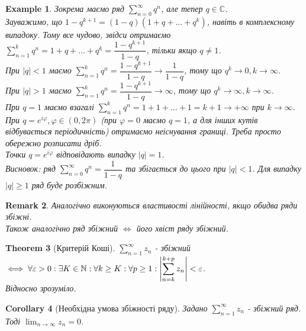 \documentclass[a4paper, 10pt]{article}
\theoremstyle{theoremdd}
\newtheorem{theorem}{Theorem}[subsection]
\theoremstyle{theoremdd}
\theoremstyle{theoremdd}
\theoremstyle{theoremdd}
\newtheorem{example}[theorem]{Example}
\theoremstyle{theoremdd}
\theoremstyle{theoremdd}
\newtheorem{remark}[theorem]{Remark}
\theoremstyle{theoremdd}
\theoremstyle{theoremdd}
\newtheorem{corollary}[theorem]{Corollary}
\begin{document}
\begin{example}
Зокрема маємо ряд $\displaystyle\sum_{n=0}^\infty q^n$, але тепер $q \in \mathbb{C}$.\\
Зауважимо, що $1-q^{k+1} = (1-q)(1+q+\dots+q^k)$, навіть в комплексному випадоку. Тому все чудово, звідси отримаємо\\
$\displaystyle\sum_{n=1}^k q^n = 1 + q + \dots + q^k = \dfrac{1-q^{k+1}}{1-q}$, тільки якщо $q \neq 1$.\\
При $|q| < 1$ маємо $\displaystyle\sum_{n=1}^k q^n = \dfrac{1-q^{k+1}}{1-q} \to \dfrac{1}{1-q}$, тому що $q^k \to 0, k \to \infty$.\\
При $|q| > 1$ маємо $\displaystyle\sum_{n=1}^k q^n = \dfrac{1-q^{k+1}}{1-q} \to \infty$, тому що $q^k \to \infty, k \to \infty$.\\
При $q = 1$ маємо взагалі $\displaystyle\sum_{n=1}^k q^n = 1 + 1 + \dots + 1 = k+1 \to +\infty$ при $k \to \infty$.\\
При $q = e^{i\varphi}, \varphi \in (0,2\pi)$ (при $\varphi = 0$ маємо $q=1$, а для інших кутів відбувається періодичність) отримаємо неіснування границі. Треба просто обережно розписати дріб.\\
Точки $q = e^{i\varphi}$ відповідають випадку $|q| = 1$.\\
Висновок: ряд $\displaystyle\sum_{n=0}^\infty q^n = \dfrac{1}{1-q}$ та збігається до цього при $|q| < 1$. Для випадку $|q| \geq 1$ ряд буде розбіжним.
\end{example}

\begin{remark}
Аналогічно виконуються властивості лінійності, якщо обидва ряди збіжні.\\
Також аналогічно ряд збіжний $\iff$ його хвіст ряду збіжний.
\end{remark}

\begin{theorem}[Критерій Коші]
$\displaystyle\sum_{n=1}^\infty z_n$ - збіжний $\iff \forall \varepsilon > 0: \exists K \in \mathbb{N}: \forall k \geq K: \forall p \geq 1: \displaystyle\abs{\sum_{n=k}^{k+p} z_n} < \varepsilon$.\\
\textit{Відносно зрозуміло.}
\end{theorem}

\begin{corollary}[Необхідна умова збіжності ряду]
Задано $\displaystyle\sum_{n=1}^\infty z_n$ - збіжний ряд.\\
Тоді $\displaystyle\lim_{n \to \infty} z_n = 0$.
\end{corollary}
\end{document}
